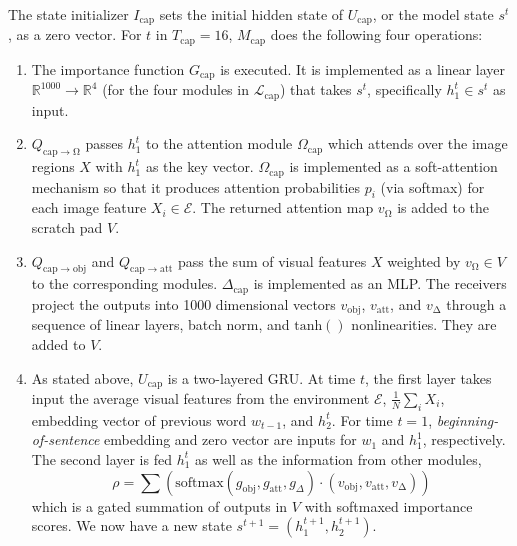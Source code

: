 \documentclass{article}
\def\E{\mathcal{E}}
\begin{document}
The state initializer $I_\mathrm{cap}$ sets the initial hidden state of $U_\mathrm{cap}$, or the model state $s^t$, as a zero vector.
For $t$ in $T_{\mathrm{cap}}=16$, $M_\mathrm{cap}$ does the following four operations:
\vspace{-2mm}\begin{enumerate}[\hspace{0pt}(1)]
\item{
The importance function $G_\mathrm{cap}$ is executed. It is implemented as a linear layer $\mathbb{R}^{1000} \to \mathbb{R}^4$ (for the four modules in $\mathcal L_\mathrm{cap}$) that takes $s^t$, specifically $h_1^t \in s^t$ as input.
} 

\item{
$Q_{\mathrm{cap}\rightarrow \mathrm{\Omega}}$ passes $h_1^t$ to the attention module $\Omega_\mathrm{cap}$ which attends over the image regions $X$ with $h_1^t$ as the key vector.
$\Omega_\mathrm{cap}$ is implemented as a soft-attention mechanism so that it produces attention probabilities $p_i$ (via softmax) for each image feature $X_i \in \E$.
The returned attention map $v_\mathrm{\Omega}$ is added to the scratch pad $V$.
} 

\item{
$Q_{\mathrm{cap}\rightarrow\mathrm{obj}}$ and $Q_{\mathrm{cap}\rightarrow\mathrm{att}}$ pass the sum of visual features $X$ weighted by $v_\mathrm{\Omega} \in V$ to the corresponding modules.
$\Delta_\mathrm{cap}$ is implemented as an MLP.
The receivers project the outputs into 1000 dimensional vectors $v_\mathrm{obj}$, $v_\mathrm{att}$, and $v_\mathrm{\Delta}$ through a sequence of linear layers, batch norm, and $\mathrm{tanh}()$ nonlinearities.
They are added to $V$.
} 

\item{
As stated above, $U_\mathrm{cap}$ is a two-layered GRU.
At time $t$, the first layer takes input the average visual features from the environment $\E$, $\frac{1}{N}\sum_{i}X_i$, embedding vector of previous word $w_{t-1}$, and $h^t_2$.
For time $t=1$, \emph{beginning-of-sentence} embedding and zero vector are inputs for $w_{1}$ and $h^{1}_1$, respectively.
The second layer is fed $h^t_1$ as well as the information from other modules,
\begin{equation}
\rho = \sum (\mathrm{softmax}(g_\mathrm{obj}, g_\mathrm{att}, g_{\Delta}) \cdot (v_\mathrm{obj}, v_\mathrm{att}, v_\mathrm{\Delta}))
\end{equation}
which is a gated summation of outputs in $V$ with softmaxed importance scores.
We now have a new state $s^{t+1} = (h^{t+1}_1, h^{t+1}_2)$.
} 
\end{enumerate}
\end{document}
